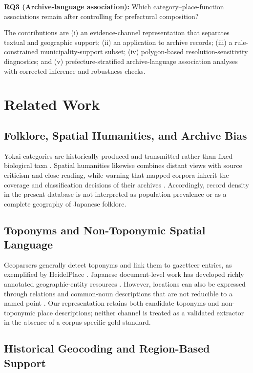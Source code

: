 \documentclass[9pt,twocolumn,a4paper]{extarticle}
\begin{document}
\textbf{RQ3 (Archive-language association):} Which category--place-function associations remain after controlling for prefectural composition?

The contributions are (i) an evidence-channel representation that separates textual and geographic support; (ii) an application to \ArchiveRecords{} archive records; (iii) a rule-constrained municipality-support subset; (iv) polygon-based resolution-sensitivity diagnostics; and (v) prefecture-stratified archive-language association analyses with corrected inference and robustness checks.

\section{Related Work}

\subsection{Folklore, Spatial Humanities, and Archive Bias}

Yokai categories are historically produced and transmitted rather than fixed biological taxa \citep{foster2024}. Spatial humanities likewise combines distant views with source criticism and close reading, while warning that mapped corpora inherit the coverage and classification decisions of their archives \citep{gregory2014}. Accordingly, record density in the present database is not interpreted as population prevalence or as a complete geography of Japanese folklore.

\subsection{Toponyms and Non-Toponymic Spatial Language}

Geoparsers generally detect toponyms and link them to gazetteer entries, as exemplified by HeidelPlace \citep{richter2017}. Japanese document-level work has developed richly annotated geographic-entity resources \citep{higashiyama2024}. However, locations can also be expressed through relations and common-noun descriptions that are not reducible to a named point \citep{stock2022}. Our representation retains both candidate toponyms and non-toponymic place descriptions; neither channel is treated as a validated extractor in the absence of a corpus-specific gold standard.

\subsection{Historical Geocoding and Region-Based Support}
\end{document}
